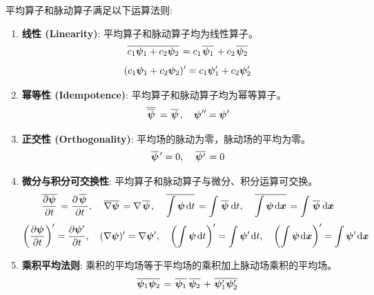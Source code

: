 平均算子和脉动算子满足以下运算法则:
\begin{enumerate}
    \item \textbf{线性 (Linearity)}: 平均算子和脉动算子均为线性算子。
    \begin{equation}
        \mkern2mu \overline{c_1 \bm{\psi}_1 + c_2 \bm{\psi}_2} \mkern2mu = c_1 \mkern2mu \overline{\bm{\psi}_1} \mkern2mu + c_2 \mkern2mu \overline{\bm{\psi}_2} \mkern2mu
        \label{eq:average_linear}
    \end{equation}
    \begin{equation}
        (c_1 \bm{\psi}_1 + c_2 \bm{\psi}_2)' = c_1 \bm{\psi}_1' + c_2 \bm{\psi}_2'
        \label{eq:fluctuation_linear}
    \end{equation}

    \item \textbf{幂等性 (Idempotence)}: 平均算子和脉动算子均为幂等算子。
    \begin{equation}
        \mean{\mean{\wavefunc}} = \mean{\wavefunc}, \quad \fluct{\fluct{\wavefunc}} = \fluct{\wavefunc}
        \label{eq:idempotence}
    \end{equation}

    \item \textbf{正交性 (Orthogonality)}: 平均场的脉动为零，脉动场的平均为零。
    \begin{equation}
        \mkern2mu \overline{\bm{\psi}} \mkern2mu' = 0, \quad \mkern2mu \overline{\bm{\psi}'} \mkern2mu = 0
        \label{eq:orthogonality}
    \end{equation}

    \item \textbf{微分与积分可交换性}: 平均算子和脉动算子与微分、积分运算可交换。
    \begin{equation}
        \mean{\pde{\wavefunc}{\timevar}} = \pde{\mean{\wavefunc}}{\timevar}, \quad \mean{\nabla \wavefunc} = \nabla \mean{\wavefunc}, \quad \mean{\int \wavefunc \dd \timevar} = \int \mean{\wavefunc} \dd \timevar, \quad \mean{\int \wavefunc \dd \pos} = \int \mean{\wavefunc} \dd \pos
        \label{eq:average_exchangeability}
    \end{equation}
    \begin{equation}
        \fluct{\left(\pde{\wavefunc}{\timevar}\right)} = \pde{\fluct{\wavefunc}}{\timevar}, \quad \fluct{(\nabla \wavefunc)} = \nabla \fluct{\wavefunc}, \quad \fluct{\left(\int \wavefunc \dd \timevar\right)} = \int \fluct{\wavefunc} \dd \timevar, \quad \fluct{\left(\int \wavefunc \dd \pos\right)} = \int \fluct{\wavefunc} \dd \pos
        \label{eq:fluctuation_exchangeability}
    \end{equation}

    \item \textbf{乘积平均法则}: 乘积的平均场等于平均场的乘积加上脉动场乘积的平均场。
    \begin{equation}
        \mean{\wavefunc_1 \wavefunc_2} = \mean{\wavefunc_1} \mean{\wavefunc_2} + \mean{\fluct{\wavefunc_1} \fluct{\wavefunc_2}}
        \label{eq:product_average_rule}
    \end{equation}
\end{enumerate}


